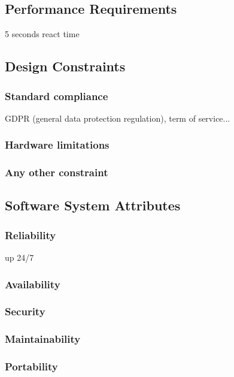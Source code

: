 \subsection{Performance Requirements}
5 seconds react time
\subsection{Design Constraints}
\subsubsection{Standard compliance}
GDPR (general data protection regulation), term of service...
\subsubsection{Hardware limitations}

\subsubsection{Any other constraint}
\subsection{Software System Attributes}
\subsubsection{Reliability}
up 24/7
\subsubsection{Availability}
\subsubsection{Security}
\subsubsection{Maintainability}
\subsubsection{Portability}
